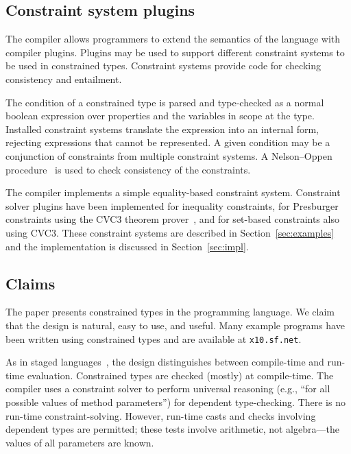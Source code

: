 \subsection{Constraint system plugins}

The \Xten{} compiler allows  
programmers to extend the semantics of the language with
compiler plugins.  Plugins may be used to support different constraint
systems to be used in constrained types.
Constraint systems provide code for checking consistency and
entailment.

The condition of a constrained type is parsed and type-checked
as a normal boolean expression over properties and
the  variables in scope at the type.  Installed
constraint systems translate the expression into an internal
form, rejecting expressions that cannot be represented.
%
A given condition may be a conjunction of constraints from
multiple constraint systems.
A Nelson--Oppen procedure~\cite{nelson-oppen} is used to check
consistency of the constraints.

The \Xten{} compiler
implements a simple
equality-based constraint system.  Constraint solver plugins
have been implemented for inequality constraints, for
Presburger constraints using
the CVC3 theorem prover~\cite{cvc}, and for
set-based constraints also using CVC3.
These constraint systems are described in
Section~\ref{sec:examples} and the implementation is
discussed in Section~\ref{sec:impl}.

\subsection{Claims}

The paper presents constrained types in the \Xten{} programming
language.
We claim that the design is natural, easy to use, and useful. Many
example programs have been written using constrained types and are
available at {\tt x10.sf.net}.

As in staged languages~\cite{nielson-multistage,ts97-multistage}, the
design distinguishes between compile-time and run-time
evaluation. Constrained types are checked (mostly) at compile-time.
The compiler uses a constraint solver to perform universal reasoning
(e.g., ``for all possible values of method parameters'') for dependent
type-checking.  There is no run-time constraint-solving.  However,
run-time casts and  checks involving dependent types
are permitted; these tests involve
arithmetic, not algebra---the values of all parameters are known.

